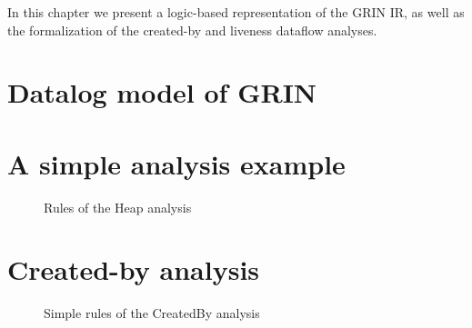 \documentclass[main.tex]{subfiles}
\begin{document}
  In this chapter we present a logic-based representation of the GRIN IR, as well as the formalization of the created-by and liveness dataflow analyses.

  \section{Datalog model of GRIN}

  \section{A simple analysis example}

  \begin{figure}

  \caption{Rules of the Heap analysis}
  \end{figure}


  \section{Created-by analysis}

  \begin{figure}
  \caption{Simple rules of the CreatedBy analysis}
  \end{figure}
\end{document}
